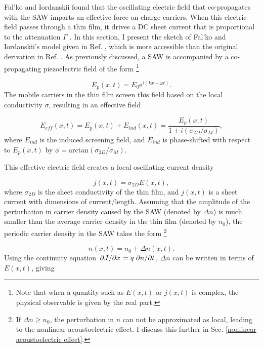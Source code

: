 \documentclass[double,12pt,1in]{beavtex}
\begin{document}
Fal'ko and Iordanskii found that the oscillating electric field that co-propagates with the SAW imparts an effective force on charge carriers. When this electric field passes through a thin film, it drives a DC sheet current that is proportional to the attenuation $\Gamma$ \cite{falko_acoustoelectric_1993}. In this section, I present the sketch of Fal'ko and Iordanskii's model given in Ref. \cite{esslinger_ultrasonic_1994}, which is more accessible than the original derivation in Ref. \cite{falko_acoustoelectric_1993}. As previously discussed, a SAW is accompanied by a co-propagating piezoelectric field of the form \footnote{Note that when a quantity such as $E(x,t)$ or $j(x,t)$ is complex, the physical observable is given by the real part.}

\begin{equation}
    E_p(x, t) = E_0 \mathrm{e}^{i(kx - \omega t)}. \label{SAW plane wave}
\end{equation}
The mobile carriers in the thin film screen this field based on the local conductivity $\sigma$, resulting in an effective field

\begin{equation}
    E_{eff}(x,t) = E_p(x,t) + E_{ind}(x,t) = \frac{E_p(x,t)}{1+i(\sigma_{2D}/\sigma_M)}, \label{E eff}
\end{equation}
where $E_{ind}$ is the induced screening field, and $E_{ind}$ is phase-shifted with respect to $E_p(x,t)$ by $\phi = \mathrm{arctan}(\sigma_{2D}/\sigma_M)$.

This effective electric field creates a local oscillating current density

\begin{equation}
    j(x,t) = \sigma_{2D} E(x,t), \label{2D AE ohm's law}
\end{equation}
where $\sigma_{2D}$ is the sheet conductivity of the thin film, and $j(x,t)$ is a sheet current with dimensions of current/length. Assuming that the amplitude of the perturbation in carrier density caused by the SAW (denoted by $\Delta n$) is much smaller than the average carrier density in the thin film (denoted by $n_0$), the periodic carrier density in the SAW takes the form \footnote{If $\Delta n \geq n_0$, the perturbation in $n$ can not be approximated as local, leading to the nonlinear acoustoelectric effect. I discuss this further in Sec. \ref{nonlinear acoustoelectric effect}.}

\begin{equation}
    n(x,t) = n_0 + \Delta n(x,t). 
\end{equation}
Using the continuity equation $\pdv*{J}{x} = q \pdv*{n}{t}$, $\Delta n$ can be written in terms of $E(x,t)$, giving
\end{document}
